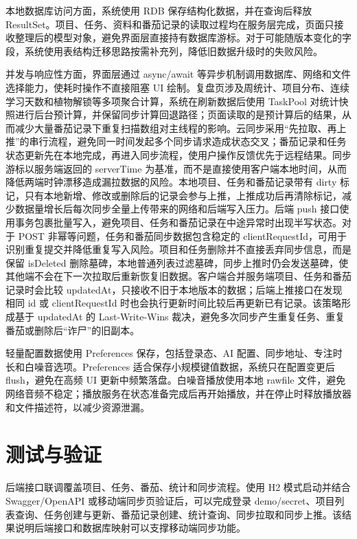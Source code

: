 本地数据库访问方面，系统使用 RDB 保存结构化数据，并在查询后释放 ResultSet。项目、任务、资料和番茄记录的读取过程均在服务层完成，页面只接收整理后的模型对象，避免界面层直接持有数据库游标。对于可能随版本变化的字段，系统使用表结构迁移思路按需补充列，降低旧数据升级时的失败风险。

并发与响应性方面，界面层通过 async/await 等异步机制调用数据库、网络和文件选择能力，使耗时操作不直接阻塞 UI 绘制。复盘页涉及周统计、项目分布、连续学习天数和植物解锁等多项聚合计算，系统在刷新数据后使用 TaskPool 对统计快照进行后台预计算，并保留同步计算回退路径；页面读取的是预计算后的结果，从而减少大量番茄记录下重复扫描数组对主线程的影响。云同步采用“先拉取、再上推”的串行流程，避免同一时间发起多个同步请求造成状态交叉；番茄记录和任务状态更新先在本地完成，再进入同步流程，使用户操作反馈优先于远程结果。同步游标以服务端返回的 serverTime 为基准，而不是直接使用客户端本地时间，从而降低两端时钟漂移造成漏拉数据的风险。本地项目、任务和番茄记录带有 dirty 标记，只有本地新增、修改或删除后的记录会参与上推，上推成功后再清除标记，减少数据量增长后每次同步全量上传带来的网络和后端写入压力。后端 push 接口使用事务包裹批量写入，避免项目、任务和番茄记录在中途异常时出现半写状态。对于 POST 非幂等问题，任务和番茄同步数据包含稳定的 clientRequestId，可用于识别重复提交并降低重复写入风险。项目和任务删除并不直接丢弃同步信息，而是保留 isDeleted 删除墓碑，本地普通列表过滤墓碑，同步上推时仍会发送墓碑，使其他端不会在下一次拉取后重新恢复旧数据。客户端合并服务端项目、任务和番茄记录时会比较 updatedAt，只接收不旧于本地版本的数据；后端上推接口在发现相同 id 或 clientRequestId 时也会执行更新时间比较后再更新已有记录。该策略形成基于 updatedAt 的 Last-Write-Wins 裁决，避免多次同步产生重复任务、重复番茄或删除后“诈尸”的旧副本。

轻量配置数据使用 Preferences 保存，包括登录态、AI 配置、同步地址、专注时长和白噪音选项。Preferences 适合保存小规模键值数据，系统只在配置变更后 flush，避免在高频 UI 更新中频繁落盘。白噪音播放使用本地 rawfile 文件，避免网络音频不稳定；播放服务在状态准备完成后再开始播放，并在停止时释放播放器和文件描述符，以减少资源泄漏。

\section{测试与验证}

后端接口联调覆盖项目、任务、番茄、统计和同步流程。使用 H2 模式启动并结合 Swagger/OpenAPI 或移动端同步页验证后，可以完成登录 demo/secret、项目列表查询、任务创建与更新、番茄记录创建、统计查询、同步拉取和同步上推。该结果说明后端接口和数据库映射可以支撑移动端同步功能。


